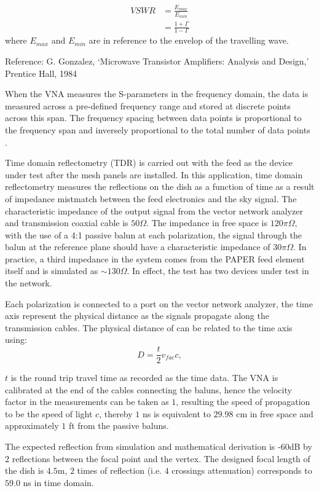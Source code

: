 \documentclass[preprint]{aastex}  %
\begin{document}
\begin{align}
VSWR & = \frac{E_{max}}{E_{min}} \nonumber \\
&	 = \frac{1+\Gamma}{1-\Gamma}
\end{align}
where $E_{max}$ and $E_{min}$ are in reference to the envelop of the travelling 
wave. 

Reference: G. Gonzalez, ‘Microwave Transistor Amplifiers: Analysis and Design,’ Prentice Hall, 1984

When the VNA measures the S-parameters in the frequency domain, the data is 
measured across a pre-defined frequency range and stored at discrete points 
across this span. The frequency spacing between data points is proportional to 
the frequency span and inversely proportional to the total number of data points
.

Time domain reflectometry (TDR) is carried out with the feed as the device 
under test after the mesh panels are installed. In this application, time 
domain reflectometry measures the reflections on the dish as a function of time 
as a result of impedance mistmatch between the feed electronics and the sky 
signal. The characteristic impedance of the output signal from the vector network analyzer and transmission coaxial cable is $50\Omega$. The impedance in free space is $120\pi\Omega$, with the use of a 4:1 passive balun at each polarization, the signal through the balun at the reference plane should have a characteristic impedance of $30\pi\Omega$. In practice, a third impedance in the system comes from the PAPER feed element itself and is simulated as $\sim130\Omega$. In effect, the test has two devices under test in the network.

Each polarization is connected to a port on the vector network analyzer, the time axis represent the physical distance as the signals propagate along the transmission cables. The physical distance of can be related to the time axis using:
\begin{equation}
D = \frac{t}{2}v_{fac}c,
\end{equation}

$t$ is the round trip travel time as recorded as the time data.
The VNA is calibrated at the end of the cables connecting the baluns, hence the 
velocity factor in the measurements can be taken as $1$, resulting the speed of 
propagation to be the speed of light $c$, thereby $1$ ns is equivalent to $29.98$ cm in free space and approximately $1$ ft from the passive baluns.

The expected reflection from simulation and mathematical derivation is -$60$dB by $2$ reflections between the focal point and the vertex. The designed focal length of the dish is $4.5$m, $2$ times of reflection (i.e. $4$ crossings attenuation) corresponds to $59.0$ ns in time domain.
\end{document}
